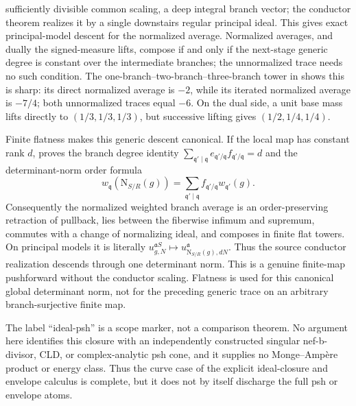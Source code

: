 sufficiently divisible common scaling, a deep integral branch vector; the
conductor theorem realizes it by a single downstairs regular principal
ideal.  This gives exact principal-model descent for the normalized average.
Normalized averages, and dually the signed-measure lifts, compose if and only
if the next-stage generic degree is constant over the intermediate branches;
the unnormalized trace needs no such condition.  The
one-branch--two-branch--three-branch tower in
 shows this is sharp: its direct
normalized average is \(-2\), while its iterated normalized average is
\(-7/4\); both unnormalized traces equal \(-6\).  On the dual side, a unit
base mass lifts directly to \((1/3,1/3,1/3)\), but successive lifting gives
\((1/2,1/4,1/4)\).

Finite flatness makes this generic descent canonical.  If the local map has
constant rank \(d\),
 proves the branch degree
identity
\(\sum_{\mathfrak q'\mid\mathfrak q}e_{\mathfrak q'/\mathfrak q}
f_{\mathfrak q'/\mathfrak q}=d\) and the determinant-norm order formula
\[
 w_{\mathfrak q}(\mathrm N_{S/R}(g))
   =\sum_{\mathfrak q'\mid\mathfrak q}
      f_{\mathfrak q'/\mathfrak q}w_{\mathfrak q'}(g).
\]
Consequently the normalized weighted branch average is an order-preserving
retraction of pullback, lies between the fiberwise infimum and supremum,
commutes with a change of normalizing ideal, and composes in finite flat
towers.  On principal models it is literally
\(u^{\mathfrak aS}_{g,N}\mapsto
u^{\mathfrak a}_{\mathrm N_{S/R}(g),dN}\).  Thus the source conductor
realization descends through one determinant norm.  This is a genuine
finite-map pushforward without the conductor scaling.  Flatness is used for
this canonical global determinant norm, not for the preceding generic trace
on an arbitrary branch-surjective finite map.

The label ``ideal-psh'' is a scope marker, not a comparison theorem.  No
argument here identifies this closure with an independently constructed
singular nef-b-divisor, CLD, or complex-analytic psh cone, and it supplies no
Monge--Amp\`ere product or energy class.  Thus the curve case of the explicit
ideal-closure and envelope calculus is complete, but it does not by itself
discharge the full psh or envelope atoms.

